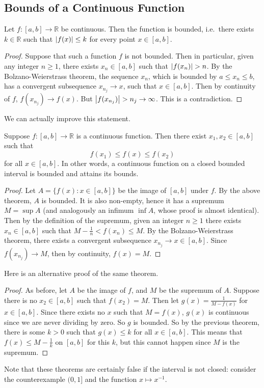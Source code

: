 \subsection{Bounds of a Continuous Function}
\begin{theorem}
	Let \(f \colon [a, b] \to \mathbb R\) be continuous. Then the function is bounded, i.e.\ there exists \(k \in \mathbb R\) such that \(\abs{f(x)} \leq k\) for every point \(x \in [a, b]\).
\end{theorem}
\begin{proof}
	Suppose that such a function \(f\) is not bounded. Then in particular, given any integer \(n \geq 1\), there exists \(x_n \in [a, b]\) such that \(\abs{f(x_n)} > n\). By the Bolzano-Weierstrass theorem, the sequence \(x_n\), which is bounded by \(a \leq x_n \leq b\), has a convergent subsequence \(x_{n_j} \to x\), such that \(x \in [a, b]\). Then by continuity of \(f\), \(f(x_{n_j}) \to f(x)\). But \(\abs{f(x_{n_j})} > n_j \to \infty\). This is a contradiction.
\end{proof}
\noindent We can actually improve this statement.
\begin{theorem}
	Suppose \(f \colon [a, b] \to \mathbb R\) is a continuous function. Then there exist \(x_1, x_2 \in [a, b]\) such that
	\[ f(x_1) \leq f(x) \leq f(x_2) \]
	for all \(x \in [a, b]\). In other words, a continuous function on a closed bounded interval is bounded and attains its bounds.
\end{theorem}
\begin{proof}
	Let \(A = \{ f(x) \colon x \in [a, b] \}\) be the image of \([a, b]\) under \(f\). By the above theorem, \(A\) is bounded. It is also non-empty, hence it has a supremum \(M = \sup A\) (and analogously an infimum \(\inf A\), whose proof is almost identical). Then by the definition of the supremum, given an integer \(n \geq 1\) there exists \(x_n \in [a, b]\) such that \(M - \frac{1}{n} < f(x_n) \leq M\). By the Bolzano-Weierstrass theorem, there exists a convergent subsequence \(x_{n_j} \to x \in [a, b]\). Since \(f(x_{n_j}) \to M\), then by continuity, \(f(x) = M\).
\end{proof}
\noindent Here is an alternative proof of the same theorem.
\begin{proof}
	As before, let \(A\) be the image of \(f\), and \(M\) be the supremum of \(A\). Suppose there is no \(x_2 \in [a, b]\) such that \(f(x_2) = M\). Then let \(g(x) = \frac{1}{M - f(x)}\) for \(x \in [a, b]\). Since there exists no \(x\) such that \(M = f(x)\), \(g(x)\) is continuous since we are never dividing by zero. So \(g\) is bounded. So by the previous theorem, there is some \(k > 0\) such that \(g(x) \leq k\) for all \(x \in [a, b]\). This means that \(f(x) \leq M - \frac{1}{k}\) on \([a, b]\) for this \(k\), but this cannot happen since \(M\) is the supremum.
\end{proof}
\noindent Note that these theorems are certainly false if the interval is not closed: consider the counterexample \((0, 1]\) and the function \(x \mapsto x^{-1}\).

